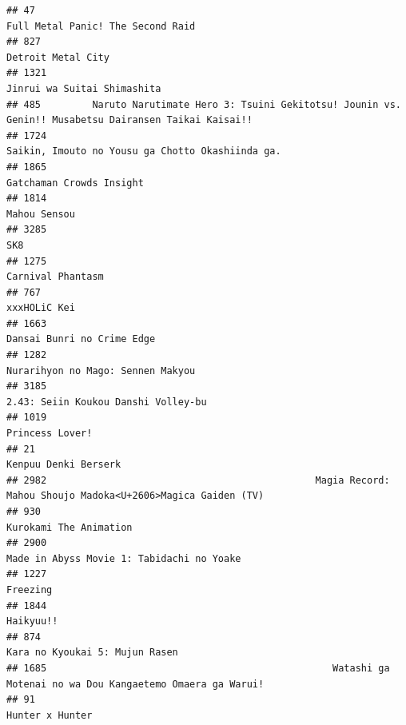 \documentclass[
]{article}
\begin{document}
\begin{verbatim}
## 47                                                                           Full Metal Panic! The Second Raid
## 827                                                                                         Detroit Metal City
## 1321                                                                               Jinrui wa Suitai Shimashita
## 485         Naruto Narutimate Hero 3: Tsuini Gekitotsu! Jounin vs. Genin!! Musabetsu Dairansen Taikai Kaisai!!
## 1724                                                          Saikin, Imouto no Yousu ga Chotto Okashiinda ga.
## 1865                                                                                  Gatchaman Crowds Insight
## 1814                                                                                              Mahou Sensou
## 3285                                                                                                       SK8
## 1275                                                                                         Carnival Phantasm
## 767                                                                                               xxxHOLiC Kei
## 1663                                                                                Dansai Bunri no Crime Edge
## 1282                                                                         Nurarihyon no Mago: Sennen Makyou
## 3185                                                                       2.43: Seiin Koukou Danshi Volley-bu
## 1019                                                                                           Princess Lover!
## 21                                                                                        Kenpuu Denki Berserk
## 2982                                               Magia Record: Mahou Shoujo Madoka<U+2606>Magica Gaiden (TV)
## 930                                                                                     Kurokami The Animation
## 2900                                                                 Made in Abyss Movie 1: Tabidachi no Yoake
## 1227                                                                                                  Freezing
## 1844                                                                                                 Haikyuu!!
## 874                                                                             Kara no Kyoukai 5: Mujun Rasen
## 1685                                                  Watashi ga Motenai no wa Dou Kangaetemo Omaera ga Warui!
## 91                                                                                             Hunter x Hunter

\end{verbatim}
\end{document}
